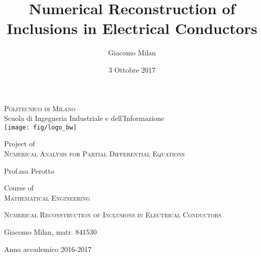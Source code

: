 \documentclass[10pt, a4paper, twoside, openright]{book}
\title{Numerical Reconstruction of Inclusions in Electrical Conductors}
\author{Giacomo Milan}
\date{3 Ottobre 2017}
\theoremstyle{definition}
\theoremstyle{plain}
\theoremstyle{plain}
\theoremstyle{plain}
\theoremstyle{plain}
\theoremstyle{plain}
\theoremstyle{plain}
\theoremstyle{plain}
\theoremstyle{plain}
\begin{document}
\frontmatter
\begin{titlepage}
    \begin{center}
        \Large
        \vspace*{1cm}
        \textsc{Politecnico di Milano}\\
        Scuola di Ingegneria Industriale e dell'Informazione\\
        \vspace{1cm}
        \texttt{[image: fig/logo\_bw]}
        
        \normalsize
        \vspace{1cm}
        Project of \\
        \large
        \textsc{Numerical Analysis for Partial Differential Equations}\\
        \begin{flushright}
        \normalsize
         Prof.ssa Perotto
        \end{flushright}
        \normalsize
        Course of \\
        \large
        \textsc{Mathematical Engineering}
        

        \vspace{0.8cm}
        \huge
        \textsc{Numerical Reconstruction of Inclusions in Electrical Conductors}
        
        
        \vspace{1.5cm}
        \begin{flushright}
        \normalsize
        {Giacomo Milan, matr. 841530}         
        \end{flushright}
        \normalsize
        \vfill
        Anno accademico 2016-2017
        
    \end{center}
\end{titlepage}
\end{document}
